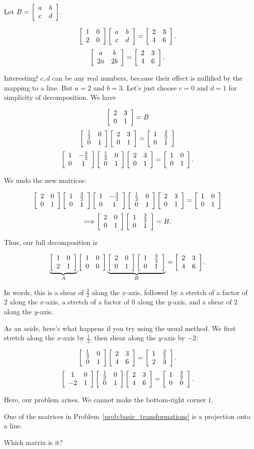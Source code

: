 \documentclass[../key.tex]{subfiles}
\begin{document}
Let $B=\twomat{a}{b}{c}{d}$.

$$\twomat{1}{0}{2}{0}\twomat{a}{b}{c}{d}=\twomat{2}{3}{4}{6}.$$
$$\twomat{a}{b}{2a}{2b}=\twomat{2}{3}{4}{6}.$$

Interesting! $c,d$ can be any real numbers, because their effect is nullified by the mapping to a line. But $a=2$ and $b=3$. Let's just choose $c=0$ and $d=1$ for simplicity of decomposition. We have

$$\twomat{2}{3}{0}{1}=B$$
$$\twomat{\frac{1}{2}}{0}{0}{1}\twomat{2}{3}{0}{1}=\twomat{1}{\frac{3}{2}}{0}{1}$$
$$\twomat{1}{-\frac{3}{2}}{0}{1}\twomat{\frac{1}{2}}{0}{0}{1}\twomat{2}{3}{0}{1}=\twomat{1}{0}{0}{1}.$$

We undo the new matrices:

$$\twomat{2}{0}{0}{1}\twomat{1}{\frac{3}{2}}{0}{1}\twomat{1}{-\frac{3}{2}}{0}{1}\twomat{\frac{1}{2}}{0}{0}{1}\twomat{2}{3}{0}{1}=\twomat{1}{0}{0}{1}$$
$$\Longrightarrow \twomat{2}{0}{0}{1}\twomat{1}{\frac{3}{2}}{0}{1} = B.$$

Thus, our full decomposition is

$$\underbrace{\twomat{1}{0}{2}{1}}_{A}\twomat{1}{0}{0}{0}\underbrace{\twomat{2}{0}{0}{1}\twomat{1}{\frac{3}{2}}{0}{1}}_{B}=\twomat{2}{3}{4}{6}.$$

In words, this is a shear of $\frac{3}{2}$ along the $x$-axis, followed by a stretch of a factor of $2$ along the $x$-axis, a stretch of a factor of $0$ along the $y$-axis, and a shear of $2$ along the $y$-axis.

As an aside, here's what happens if you try using the usual method. We first stretch along the $x$-axis by $\frac{1}{2}$, then shear along the $y$-axis by $-2$:

$$\twomat{\frac{1}{2}}{0}{0}{1}\twomat{2}{3}{4}{6} = \twomat{1}{\frac{3}{2}}{2}{3}.$$
$$\twomat{1}{0}{-2}{1}\twomat{\frac{1}{2}}{0}{0}{1}\twomat{2}{3}{4}{6} = \twomat{1}{\frac{3}{2}}{0}{0}.$$

Here, our problem arises. We cannot make the bottom-right corner $1$.

\begin{outer_problem}
\item One of the matrices in Problem~\ref{prob:basic_transformations} is a projection onto a line.
\end{outer_problem}

\begin{inner_problem}[start=1]
\item Which matrix is it?
\end{inner_problem}
\end{document}
